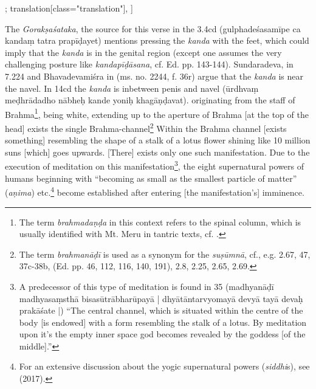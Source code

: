 \begin{alignment}[
  texts=edition[class="edition"];
  translation[class="translation"],
  ]
\begin{translation}
\begin{tlate}
{\indent The \emph{Gorakṣaśataka}, the source for this verse in the  3.4cd (gulphadeśasamīpe ca kandaṃ tatra prapīḍayet) mentions pressing the \emph{kanda} with the feet, which could imply that the \emph{kanda} is in the genital region (except one assumes the very challenging posture like \textit{kandapīḍāsana}, cf.  Ed. pp. 143-144). Sundaradeva, in  7.224 and Bhavadevamiśra in  (ms. no. 2244, f. 36r) argue that the \emph{kanda} is near the navel. In  14cd the \textit{kanda} is inbetween penis and navel (ūrdhvaṃ meḍhrādadho nābheḥ kande yoniḥ khagāṇḍavat).} originating from the staff of Brahma\footnote{The term \textit{brahmadaṇḍa} in this context refers to the spinal column, which is usually identified with Mt. Meru in tantric texts, cf. \citeauthor[1988: 360]{stupa}.}, being white, extending up to the aperture of Brahma [at the top of the head] exists the single Brahma-channel\footnote{The term \textit{brahmanāḍī} is used as a synonym for the \textit{suṣūmnā}, cf., e.g.  2.67,  47,  37c-38b,  (Ed. pp. 46, 112, 116, 140, 191),  2.8, 2.25, 2.65, 2.69.} Within the Brahma channel [exists something] resembling the shape of a stalk of a lotus flower shining like 10 million suns [which] goes upwards. [There] exists only one such manifestation. Due to the execution of meditation on this manifestation\footnote{A predecessor of this type of meditation is found in  35 (madhyanāḍī madhyasaṃsthā bisasūtrābharūpayā | dhyātāntarvyomayā devyā tayā devaḥ prakāśate |) ``The central channel, which is situated within the centre of the body [is endowed] with a form resembling the stalk of a lotus. By meditation upon it's the empty inner space god becomes revealed by the goddess [of the middle].''}, the eight supernatural powers of humans beginning with ``becoming as small as the smallest particle of matter'' (\textit{aṇima}) etc.\footnote{For an extensive discussion about the yogic supernatural powers (\textit{siddhi}s), see \citeauthor{yogapowers2017} (2017).} become established after entering [the manifestation's] imminence.\textsuperscript{\coro{[\lowroman{5}]}}
    \end{tlate}
  \end{translation}
\end{alignment}
\ekdpb*{}

